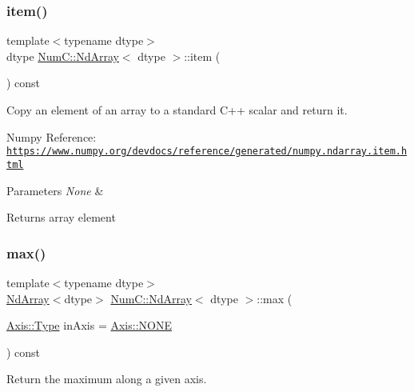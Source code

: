 \subsubsection{\texorpdfstring{item()}{item()}}
{\footnotesize\ttfamily template$<$typename dtype$>$ \\
dtype \mbox{\hyperlink{class_num_c_1_1_nd_array}{Num\+C\+::\+Nd\+Array}}$<$ dtype $>$\+::item (\begin{DoxyParamCaption}{ }\end{DoxyParamCaption}) const\hspace{0.3cm}{\ttfamily [inline]}}

Copy an element of an array to a standard C++ scalar and return it.

Numpy Reference\+: \href{https://www.numpy.org/devdocs/reference/generated/numpy.ndarray.item.html}{\tt https\+://www.\+numpy.\+org/devdocs/reference/generated/numpy.\+ndarray.\+item.\+html}


\begin{DoxyParams}{Parameters}
{\em None} & \\
\hline
\end{DoxyParams}
\begin{DoxyReturn}{Returns}
array element 
\end{DoxyReturn}
\mbox{\label{class_num_c_1_1_nd_array_ae080f0343d72279ca5f5e51722bf2f4b}} 
\subsubsection{\texorpdfstring{max()}{max()}}
{\footnotesize\ttfamily template$<$typename dtype$>$ \\
\mbox{\hyperlink{class_num_c_1_1_nd_array}{Nd\+Array}}$<$dtype$>$ \mbox{\hyperlink{class_num_c_1_1_nd_array}{Num\+C\+::\+Nd\+Array}}$<$ dtype $>$\+::max (\begin{DoxyParamCaption}\item[{\mbox{\hyperlink{struct_num_c_1_1_axis_a8e689044ef1941a03482e730c5e7ebb3}{Axis\+::\+Type}}}]{in\+Axis = {\ttfamily \mbox{\hyperlink{struct_num_c_1_1_axis_a8e689044ef1941a03482e730c5e7ebb3a0ae033c4226f7184bf0050b101e7ed94}{Axis\+::\+N\+O\+NE}}} }\end{DoxyParamCaption}) const\hspace{0.3cm}{\ttfamily [inline]}}

Return the maximum along a given axis.

